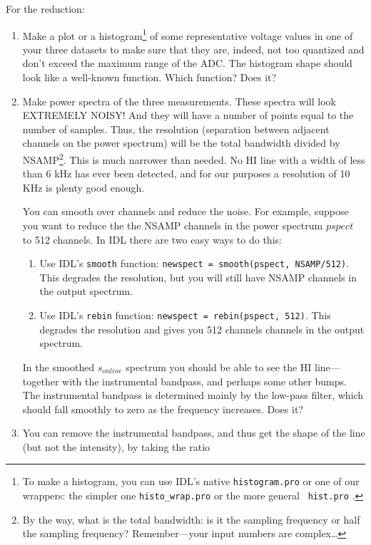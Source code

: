 \documentclass[11pt,preprint]{aastex}
\begin{document}
For the reduction: \begin{enumerate}

\item Make a plot or a histogram\footnote{To make a histogram, you can
  use IDL's native {\tt histogram.pro} or one of our wrappers:
  the simpler one {\tt histo\_wrap.pro} or the more general {\tt
  hist.pro} .} of some representative voltage values in one of your three
  datasets to make sure that they are, indeed, not too quantized and
  don't exceed the maximum range of the ADC. The histogram shape should
  look like a well-known function. Which function? Does it?

\item Make power spectra of the three measurements.  These spectra will
look EXTREMELY NOISY! And they will have a number of points equal to the
number of samples. Thus, the resolution (separation between adjacent
channels on the power spectrum) will be the total bandwidth divided by
NSAMP\footnote{By the way, what is the total bandwidth: is it the
sampling frequency or half the sampling frequency? Remember---your input
numbers are complex\dots}. This is much
narrower than needed. No HI line with a width of less than 6 kHz has
ever been detected, and for our purposes a resolution of 10 KHz is
plenty good enough. 

You can smooth over channels and reduce the noise. For example, suppose you
want to reduce the the NSAMP channels in the power spectrum $pspect$ to 512
channels. In IDL there are two
easy ways to do this: \begin{enumerate}

\item Use IDL's {\tt smooth} function: {\tt newspect = smooth(pspect,
    NSAMP/512)}. This degrades the resolution, but you will still have
  NSAMP channels in the output spectrum.

\item Use IDL's {\tt rebin} function: {\tt newspect = rebin(pspect, 512)}.
  This degrades the resolution and gives you 512 channels channels in the
  output spectrum.
\end{enumerate}

  In the smoothed $s_{online}$ spectrum you should be able to see the HI
line---together with the instrumental bandpass, and perhaps some other
bumps. The instrumental bandpass is determined mainly by the low-pass
filter, which should fall smoothly to zero as the frequency
increases. Does it? 

\item You can remove the instrumental bandpass, and thus get the shape
  of the line (but not the intensity), by taking the ratio 


\end{enumerate}
\end{document}

